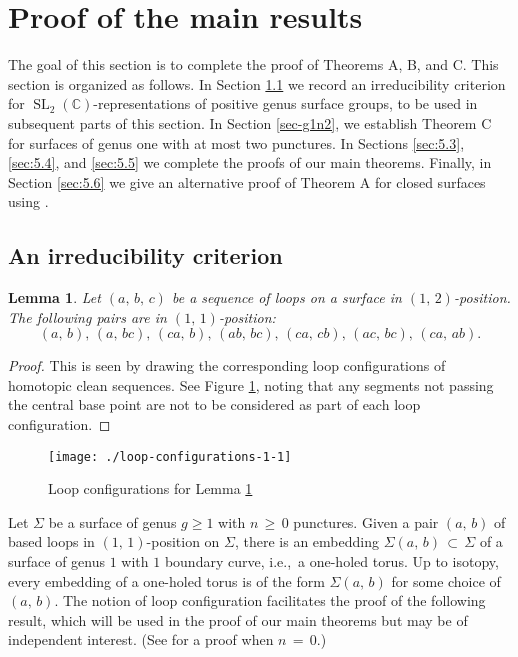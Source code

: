 \documentclass[reqno]{amsart}
\theoremstyle{plain}
\newtheorem{lemma}[theorem]{Lemma}
\theoremstyle{definition}
\theoremstyle{remark}
\newcommand{\C}{{\mathbb{C}}}
\DeclareMathOperator{\SL}{SL}
\begin{document}
\section{Proof of the main results}\label{sect:5}

The goal of this section is to complete the proof of Theorems A, B, and C. This section is organized as 
follows. In Section \ref{sec-irred} we record an irreducibility criterion for $\SL_2(\C)$-representations of 
positive genus surface groups, to be used in subsequent parts of this section. In Section \ref{sec-g1n2}, we 
establish Theorem C for surfaces of genus one with at most two punctures. In Sections \ref{sec:5.3}, 
\ref{sec:5.4}, and \ref{sec:5.5} we complete the proofs of our main theorems. Finally, in Section \ref{sec:5.6} 
we give an alternative proof of Theorem A for closed surfaces using \cite{gkm,px}.

\subsection{An irreducibility criterion}\label{sec-irred}
\begin{lemma}
\label{loops}
Let $(a,\,b,\,c)$ be a sequence of loops on a surface in $(1,\,2)$-position. The following pairs are in
$(1,\,1)$-position:
$$(a,\,b),\,(a,\,bc),\,(ca,\,b),\,(ab,\,bc),\,(ca,\,cb),\,(ac,\,bc),\,(ca,\,ab).$$
\end{lemma}

\begin{proof}
This is seen by drawing the corresponding loop configurations of homotopic clean sequences. See
Figure \ref{fig5}, noting that any segments not passing the central base point are not to be considered
as part of each loop configuration.
\end{proof}

\begin{figure}[ht]
    \centering
    \texttt{[image: ./loop-configurations-1-1]}
    \caption{Loop configurations for Lemma \ref{loops}}
    \label{fig5}
\end{figure}

Let $\Sigma$ be a surface of genus $g\geq1$ with $n\,\geq\,0$ punctures. Given a pair $(a,\,b)$ of based loops in 
$(1,\,1)$-position on $\Sigma$, there is an embedding $\Sigma(a,\,b)\,\subset\,\Sigma$ of a surface of genus $1$ with 
$1$ boundary curve, i.e.,~a one-holed torus. Up to isotopy, every embedding of a one-holed torus is of the form 
$\Sigma(a,\,b)$ for some choice of $(a,\,b)$. The notion of loop configuration facilitates the proof of the 
following result, which will be used in the proof of our main theorems but may be of independent interest. (See 
\cite{coopermanning} for a proof when $n\,=\,0$.)
\end{document}
